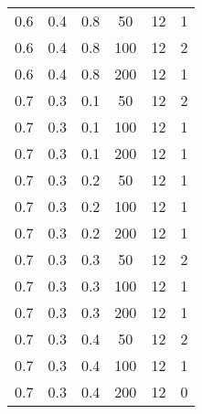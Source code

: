 \begin{table}[h]
\begin{center}
\begin{threeparttable}
\begin{tabular}{|c|c|c|c|c|c|}
   \hline
	0.6 &  0.4 &  0.8 &   50 &    12 &     1 \\
	0.6 &  0.4 &  0.8 &  100 &    12 &     2 \\
	0.6 &  0.4 &  0.8 &  200 &    12 &     1 \\
   \hline
	0.7 &  0.3 &  0.1 &   50 &    12 &     2 \\
	0.7 &  0.3 &  0.1 &  100 &    12 &     1 \\
	0.7 &  0.3 &  0.1 &  200 &    12 &     1 \\
   \hline
	0.7 &  0.3 &  0.2 &   50 &    12 &     1 \\
	0.7 &  0.3 &  0.2 &  100 &    12 &     1 \\
	0.7 &  0.3 &  0.2 &  200 &    12 &     1 \\
   \hline
	0.7 &  0.3 &  0.3 &   50 &    12 &     2 \\
	0.7 &  0.3 &  0.3 &  100 &    12 &     1 \\
	0.7 &  0.3 &  0.3 &  200 &    12 &     1 \\
   \hline
	0.7 &  0.3 &  0.4 &   50 &    12 &     2 \\
	0.7 &  0.3 &  0.4 &  100 &    12 &     1 \\
	0.7 &  0.3 &  0.4 &  200 &    12 &     0 \\
   \hline
    		\end{tabular}
        \end{threeparttable}
	\end{center}
\end{table}
